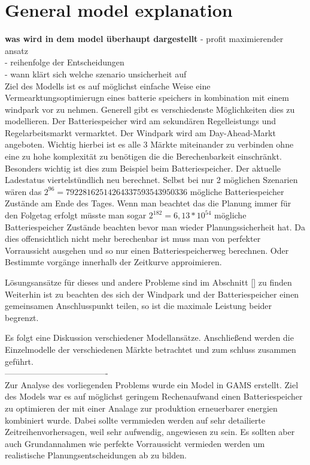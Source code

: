 
\section{General model explanation}

\textbf{was wird in dem model überhaupt dargestellt}
- profit maximierender ansatz\\
- reihenfolge der Entscheidungen\\
- wann klärt sich welche szenario unsicherheit auf\\

Ziel des Modells ist es auf möglichst einfache Weise eine Vermearktungsoptimierugn eines batterie speichers in kombination mit einem windpark vor zu nehmen.
Generell gibt es verschiedenste Möglichkeiten dies zu modellieren. Der Batteriespeicher wird am sekundären Regelleistungs und Regelarbeitsmarkt vermarktet.
Der Windpark wird am Day-Ahead-Markt angeboten. Wichtig hierbei ist es alle 3 Märkte miteinander zu verbinden ohne eine zu hohe komplexität zu benötigen die die Berechenbarkeit einschränkt.
Besonders wichtig ist dies zum Beispiel beim Batteriespeicher. Der aktuelle Ladestatus viertelstündlich neu berechnet. Selbst bei nur 2 möglichen Szenarien
wären das $ 2^{96} = 79228162514264337593543950336$ mögliche Batteriespeicher Zustände am Ende des Tages. Wenn man beachtet das die Planung immer für den Folgetag erfolgt
müsste man sogar $2^{182} = 6,13* 10^{54}$ mögliche Batteriespeicher Zustände beachten bevor man wieder Planungssicherheit hat.
Da dies offensichtlich nicht mehr berechenbar ist muss man von perfekter Vorraussicht ausgehen und so nur einen Batteriespeicherweg berechnen.
Oder Bestimmte vorgänge innerhalb der Zeitkurve approimieren.

Lösungsansätze für dieses und andere Probleme sind im Abschnitt [] zu finden
Weiterhin ist zu beachten des sich der Windpark und der Batteriespeicher einen gemeinsamen Anschlusspunkt teilen, so ist die maximale Leistung beider begrenzt.

Es folgt eine Diskussion verschiedener Modellansätze. Anschließend werden die Einzelmodelle der verschiedenen Märkte betrachtet und zum schluss zusammen geführt.\\
-------------------------------------\\
Zur Analyse des vorliegenden Problems wurde ein Model in GAMS erstellt.
Ziel des Models war es auf möglichst geringem Rechenaufwand einen Batteriespeicher zu optimieren der mit
einer Analage zur produktion erneuerbarer energien kombiniert wurde. Dabei sollte vermmieden werden
auf sehr detailierte Zeitreihenvorhersagen, weil sehr aufwendig, angewiesen zu sein. Es sollten aber auch
Grundannahmen wie perfekte Vorraussicht vermieden werden um realistische Planungsentscheidungen ab zu bilden.

